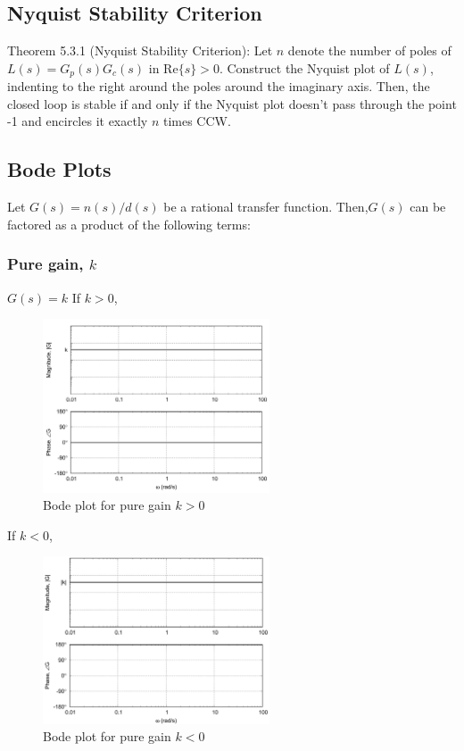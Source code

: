 \documentclass[letterpaper,12pt]{article}
\begin{document}
\subsection{Nyquist Stability Criterion}
Theorem 5.3.1 (Nyquist Stability Criterion): Let $n$ denote the number of poles of $L(s) = G_p(s) G_c(s)$ in Re$\{s\} > 0$. Construct
the Nyquist plot of $L(s)$, indenting to the right around the poles around the imaginary axis. Then, the closed loop is stable 
if and only if the Nyquist plot doesn't pass through the point -1 and encircles it exactly $n$ times CCW.

\subsection{Bode Plots}
Let $G(s)=n(s)/d(s)$ be a rational transfer function. Then,$G(s)$ can be factored as a product of the following terms:
\subsubsection{Pure gain, $k$}
$G(s) = k$
If $k > 0$, 
\begin{figure}[h]
    \centering
    \includegraphics[width=0.6\textwidth]{case1 pure gain greater than 0.png}
    \caption{Bode plot for pure gain $k > 0$}
\end{figure}
If $k < 0$,
\begin{figure}[h]
    \centering
    \includegraphics[width=0.6\textwidth]{case2 pure gain less than 0.png}
    \caption{Bode plot for pure gain $k < 0$}
\end{figure}
\FloatBarrier
\end{document}
